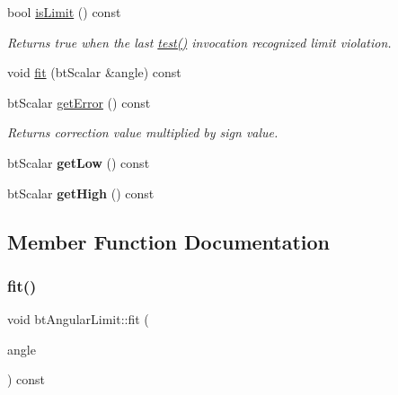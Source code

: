 \begin{DoxyCompactItemize}
\mbox{\label{classbtAngularLimit_a034951d30c7aa18f0e0ed7f2673175ee}} 
bool \hyperlink{classbtAngularLimit_a034951d30c7aa18f0e0ed7f2673175ee}{is\+Limit} () const
\begin{DoxyCompactList}\small\item\em Returns true when the last \hyperlink{classbtAngularLimit_aa8908e320fa18257118bbe81948142d8}{test()} invocation recognized limit violation. \end{DoxyCompactList}\item 
void \hyperlink{classbtAngularLimit_aba82fc7d176c0b4e483eb3959f84eb65}{fit} (bt\+Scalar \&angle) const
\item 
\mbox{\label{classbtAngularLimit_a781f6596d248dbd0bc074069ca3bde2a}} 
bt\+Scalar \hyperlink{classbtAngularLimit_a781f6596d248dbd0bc074069ca3bde2a}{get\+Error} () const
\begin{DoxyCompactList}\small\item\em Returns correction value multiplied by sign value. \end{DoxyCompactList}\item 
\mbox{\label{classbtAngularLimit_a2c131db6c0d9a10f3631b54a1075b4cd}} 
bt\+Scalar {\bfseries get\+Low} () const
\item 
\mbox{\label{classbtAngularLimit_a45dee16704e05e7e0fa485fe150f61f0}} 
bt\+Scalar {\bfseries get\+High} () const
\end{DoxyCompactItemize}


\subsection{Member Function Documentation}
\mbox{\label{classbtAngularLimit_aba82fc7d176c0b4e483eb3959f84eb65}} 
\subsubsection{\texorpdfstring{fit()}{fit()}\hspace{0.1cm}{\footnotesize\ttfamily [1/2]}}
{\footnotesize\ttfamily void bt\+Angular\+Limit\+::fit (\begin{DoxyParamCaption}\item[{bt\+Scalar \&}]{angle }\end{DoxyParamCaption}) const}

